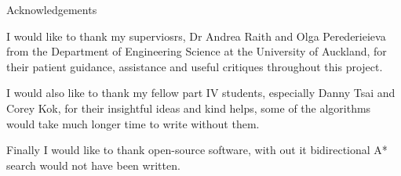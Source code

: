 \begin{center}
\Huge Acknowledgements
\end{center}
I would like to thank my superviosrs, Dr Andrea Raith and Olga Perederieieva from the Department of Engineering Science at the University of Auckland,
for their patient guidance, assistance and useful critiques throughout this project.

I would also like to thank my fellow part IV students, especially Danny Tsai and Corey Kok, for their insightful ideas and kind helps, some of the algorithms would take much longer time to write without them.

Finally I would like to thank open-source software,
with out it bidirectional A* search would not have been written.


